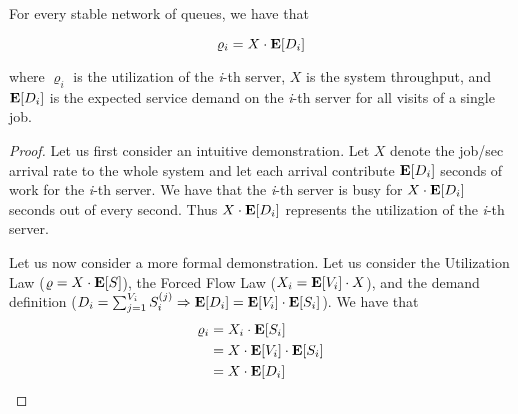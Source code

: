 \begin{theorem}
\label{thm:Bottleneck-Law}	
	For every stable network of queues, we have that
	
	\begin{equation}
	\label{eqn:Bottleneck-Law}
	\varrho_{i} = X \cdot \expected{D_{i}}
	\end{equation}
	
	where 
	$\varrho_{i}$ is the utilization of the \textit{i}-th server, 
	$X$ is the system throughput, and
	$\mathbf{E}[D_{i}]$ is the expected service demand on the \textit{i}-th server for all visits of a single job.
	
	\begin{proof}
		Let us first consider an intuitive demonstration.
		Let $X$ denote the job/sec arrival rate to the whole system and let each arrival contribute $\mathbf{E}[D_{i}]$ seconds of work for the \textit{i}-th server. We have that the \textit{i}-th server is busy for $X \cdot \mathbf{E}[D_{i}]$ seconds out of every second.
		Thus $X \cdot \mathbf{E}[D_{i}]$ represents the utilization of the \textit{i}-th server.
		
		Let us now consider a more formal demonstration.
		Let us consider 
		the Utilization Law ($\varrho = X \cdot \mathbf{E}[S]$),
		the Forced Flow Law ($X_{i} = \mathbf{E}[V_{i}] \cdot X$), and
		the demand definition ($D_{i} = \sum_{j=1}^{V_{i}}S_{i}^{(j)} \Rightarrow \mathbf{E}[D_{i}] = \mathbf{E}[V_{i}] \cdot \mathbf{E}[S_{i}]$).
		We have that
		\begin{equation*}
			\begin{split}
				\varrho_{i} & = X_{i} \cdot \mathbf{E}[S_{i}] \\
							& = X \cdot \mathbf{E}[V_{i}] \cdot \mathbf{E}[S_{i}] \\
							& = X \cdot \mathbf{E}[D_{i}]
			\end{split}
		\end{equation*}
	\end{proof}
\end{theorem}